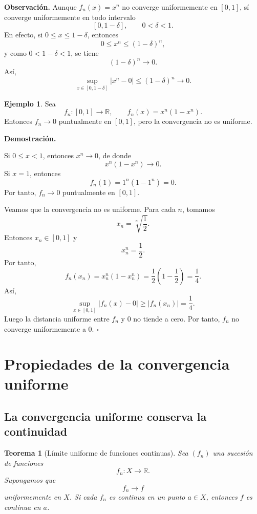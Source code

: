 \documentclass[11pt,a4paper,openany]{book}
\theoremstyle{definition}
\newtheorem{ejemplo}{Ejemplo}[chapter]
\theoremstyle{plain}
\newtheorem{teorema}{Teorema}[chapter]
\theoremstyle{remark}
\renewenvironment{proof}[1][\textbf{Demostración.}]{%
  \par\noindent #1\ \normalfont
}{\hfill$\square$\par\medskip}
\newenvironment{observacion}
{\par\medskip\noindent\textbf{Observación. }\normalfont}
{\par\medskip}
\newcommand{\R}{\mathbb{R}}
\begin{document}
\begin{observacion}
Aunque $f_n(x)=x^n$ no converge uniformemente en $[0,1]$, sí converge
uniformemente en todo intervalo
\[
    [0,1-\delta],
    \qquad 0<\delta<1.
\]
En efecto, si $0\leq x\leq 1-\delta$, entonces
\[
    0\leq x^n\leq (1-\delta)^n,
\]
y como $0<1-\delta<1$, se tiene
\[
    (1-\delta)^n\to 0.
\]
Así,
\[
    \sup_{x\in[0,1-\delta]}|x^n-0|
    \leq (1-\delta)^n\to 0.
\]
\end{observacion}

\begin{ejemplo}
Sea
\[
    f_n:[0,1]\to\R,\qquad f_n(x)=x^n(1-x^n).
\]
Entonces $f_n\to 0$ puntualmente en $[0,1]$, pero la convergencia no es
uniforme.

\begin{proof}
Si $0\leq x<1$, entonces $x^n\to 0$, de donde
\[
    x^n(1-x^n)\to 0.
\]
Si $x=1$, entonces
\[
    f_n(1)=1^n(1-1^n)=0.
\]
Por tanto, $f_n\to 0$ puntualmente en $[0,1]$.

Veamos que la convergencia no es uniforme. Para cada $n$, tomamos
\[
    x_n=\sqrt[n]{\frac12}.
\]
Entonces $x_n\in[0,1]$ y
\[
    x_n^n=\frac12.
\]
Por tanto,
\[
    f_n(x_n)
    =
    x_n^n(1-x_n^n)
    =
    \frac12\left(1-\frac12\right)
    =
    \frac14.
\]
Así,
\[
    \sup_{x\in[0,1]}|f_n(x)-0|
    \geq
    |f_n(x_n)|
    =
    \frac14.
\]
Luego la distancia uniforme entre $f_n$ y $0$ no tiende a cero. Por tanto,
$f_n$ no converge uniformemente a $0$.
\end{proof}
\end{ejemplo}

\section{Propiedades de la convergencia uniforme}

\subsection{La convergencia uniforme conserva la continuidad}

\begin{grisplano}
\begin{teorema}[Límite uniforme de funciones continuas]
Sea $(f_n)$ una sucesión de funciones
\[
    f_n:X\to\R.
\]
Supongamos que
\[
    f_n\to f
\]
uniformemente en $X$. Si cada $f_n$ es continua en un punto $a\in X$, entonces
$f$ es continua en $a$.
\end{teorema}
\end{grisplano}
\end{document}
